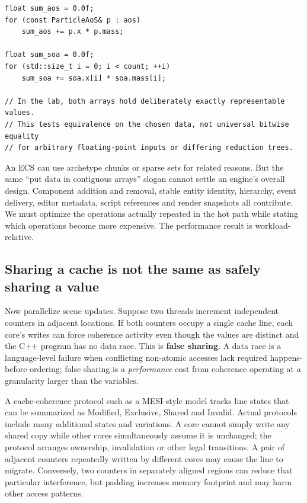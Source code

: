 \begin{verbatim}
float sum_aos = 0.0f;
for (const ParticleAoS& p : aos)
    sum_aos += p.x * p.mass;

float sum_soa = 0.0f;
for (std::size_t i = 0; i < count; ++i)
    sum_soa += soa.x[i] * soa.mass[i];

// In the lab, both arrays hold deliberately exactly representable values.
// This tests equivalence on the chosen data, not universal bitwise equality
// for arbitrary floating-point inputs or differing reduction trees.
\end{verbatim}

An ECS can use archetype chunks or sparse sets for related reasons. But the same ``put data in contiguous arrays'' slogan cannot settle an engine's overall design. Component addition and removal, stable entity identity, hierarchy, event delivery, editor metadata, script references and render snapshots all contribute. We must optimize the operations actually repeated in the hot path while stating which operations become more expensive. The performance result is workload-relative.

\subsection{Sharing a cache is not the same as safely sharing a value}\label{05-engine-i-ch007-sharing-a-cache-is-not-the-same-as-safely-sharing-a-value}

Now parallelize scene updates. Suppose two threads increment independent counters in adjacent locations. If both counters occupy a single cache line, each core's writes can force coherence activity even though the values are distinct and the C++ program has no data race. This is \textbf{false sharing}. A data race is a language-level failure when conflicting non-atomic accesses lack required happens-before ordering; false sharing is a \emph{performance} cost from coherence operating at a granularity larger than the variables.

A cache-coherence protocol such as a MESI-style model tracks line states that can be summarized as Modified, Exclusive, Shared and Invalid. Actual protocols include many additional states and variations. A core cannot simply write any shared copy while other cores simultaneously assume it is unchanged; the protocol arranges ownership, invalidation or other legal transitions. A pair of adjacent counters repeatedly written by different cores may cause the line to migrate. Conversely, two counters in separately aligned regions can reduce that particular interference, but padding increases memory footprint and may harm other access patterns.


